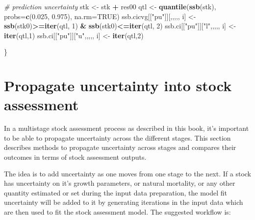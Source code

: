 \documentclass[
]{book}
\newenvironment{Shaded}{\begin{snugshade}}{\end{snugshade}}
\newcommand{\AttributeTok}[1]{\textcolor[rgb]{0.13,0.29,0.53}{#1}}
\newcommand{\CommentTok}[1]{\textcolor[rgb]{0.56,0.35,0.01}{\textit{#1}}}
\newcommand{\ConstantTok}[1]{\textcolor[rgb]{0.56,0.35,0.01}{#1}}
\newcommand{\DecValTok}[1]{\textcolor[rgb]{0.00,0.00,0.81}{#1}}
\newcommand{\FloatTok}[1]{\textcolor[rgb]{0.00,0.00,0.81}{#1}}
\newcommand{\FunctionTok}[1]{\textcolor[rgb]{0.13,0.29,0.53}{\textbf{#1}}}
\newcommand{\NormalTok}[1]{#1}
\newcommand{\OtherTok}[1]{\textcolor[rgb]{0.56,0.35,0.01}{#1}}
\newcommand{\SpecialCharTok}[1]{\textcolor[rgb]{0.81,0.36,0.00}{\textbf{#1}}}
\newcommand{\StringTok}[1]{\textcolor[rgb]{0.31,0.60,0.02}{#1}}
\begin{document}
\begin{Shaded}
\begin{Highlighting}[]
  \CommentTok{\# prediction uncertainty}
\NormalTok{  stk }\OtherTok{\textless{}{-}}\NormalTok{ stk }\SpecialCharTok{+}\NormalTok{ res00}
\NormalTok{  qtl }\OtherTok{\textless{}{-}} \FunctionTok{quantile}\NormalTok{(}\FunctionTok{ssb}\NormalTok{(stk), }\AttributeTok{probs=}\FunctionTok{c}\NormalTok{(}\FloatTok{0.025}\NormalTok{, }\FloatTok{0.975}\NormalTok{), }\AttributeTok{na.rm=}\ConstantTok{TRUE}\NormalTok{)}
\NormalTok{  ssb.cicvg[[}\StringTok{"pu"}\NormalTok{]][,,,,, i] }\OtherTok{\textless{}{-}} \FunctionTok{ssb}\NormalTok{(stk0)}\SpecialCharTok{\textgreater{}=}\FunctionTok{iter}\NormalTok{(qtl, }\DecValTok{1}\NormalTok{) }\SpecialCharTok{\&} \FunctionTok{ssb}\NormalTok{(stk0)}\SpecialCharTok{\textless{}=}\FunctionTok{iter}\NormalTok{(qtl, }\DecValTok{2}\NormalTok{)}
\NormalTok{  ssb.ci[[}\StringTok{"pu"}\NormalTok{]][}\StringTok{"l"}\NormalTok{,,,,, i] }\OtherTok{\textless{}{-}} \FunctionTok{iter}\NormalTok{(qtl,}\DecValTok{1}\NormalTok{)}
\NormalTok{  ssb.ci[[}\StringTok{"pu"}\NormalTok{]][}\StringTok{"u"}\NormalTok{,,,,, i] }\OtherTok{\textless{}{-}} \FunctionTok{iter}\NormalTok{(qtl,}\DecValTok{2}\NormalTok{)}

\NormalTok{\}}
\end{Highlighting}
\end{Shaded}

\hypertarget{propagate-uncertainty-into-stock-assessment}{%
\section{Propagate uncertainty into stock assessment}\label{propagate-uncertainty-into-stock-assessment}}

In a multistage stock assessment process as described in this book, it's important to be able to propagate uncertainty across the different stages. This section describes methods to propagate uncertainty across stages and compares their outcomes in terms of stock assessment outputs.

The idea is to add uncertainty as one moves from one stage to the next. If a stock has uncertainty on it's growth parameters, or natural mortality, or any other quantity estimated or set during the input data preparation, the model fit uncertainty will be added to it by generating iterations in the input data which are then used to fit the stock assessment model. The suggested workflow is:
\end{document}
